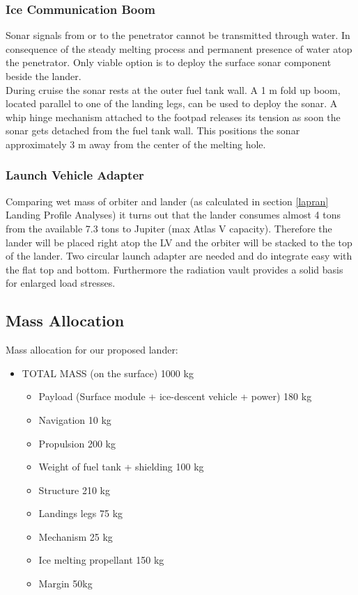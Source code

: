 \subsubsection{Ice Communication Boom}
Sonar signals from or to the penetrator cannot be transmitted through water. In consequence of the steady melting process and permanent presence of water atop the penetrator. Only viable option is to deploy the surface sonar component beside the lander.\\
During cruise the sonar rests at the outer fuel tank wall. A 1 m fold up boom, located parallel to one of the landing legs, can be used to deploy the sonar. A whip hinge mechanism attached to the footpad releases its tension as soon the sonar gets detached from the fuel tank wall. This positions the sonar approximately 3 m away from the center of the melting hole.

\subsubsection{Launch Vehicle Adapter}
Comparing wet mass of orbiter and lander (as calculated in section \ref{lapran} Landing Profile Analyses) it turns out that the lander consumes almost 4 tons from the available 7.3 tons to Jupiter (max Atlas V capacity). Therefore the lander will be placed right atop the LV and the orbiter will be stacked to the top of the lander. Two circular launch adapter are needed and do integrate easy with the flat top and bottom. Furthermore the radiation vault provides a solid basis for enlarged load stresses. 


\subsection{Mass Allocation}
Mass allocation for our proposed lander:
\begin{itemize} 
\item TOTAL MASS (on the surface) 1000 kg
\begin{itemize}  
\item Payload (Surface module + ice-descent vehicle + power) 180 kg
\item Navigation 10 kg
\item Propulsion 200 kg
\item Weight of fuel tank + shielding 100 kg
\item Structure 210 kg
\item Landings legs 75 kg
\item Mechanism 25 kg
\item Ice melting propellant 150 kg
\item Margin 50kg
\end{itemize}  
\end{itemize}


